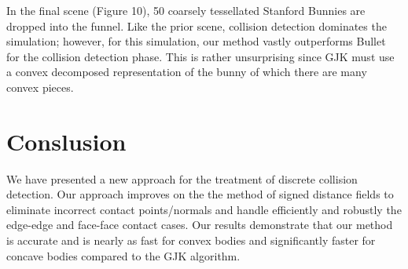 \documentclass[9pt,twocolumn]{article}
\begin{document}
In the final scene (Figure 10), 50 coarsely tessellated Stanford Bunnies are dropped into the funnel. Like the prior scene, collision detection dominates the simulation; however, for this simulation, our method vastly outperforms Bullet for the collision detection phase. This is rather unsurprising since GJK must use a convex decomposed representation of the bunny of which there are many convex pieces. 

\section{Conslusion}

We have presented a new approach for the treatment of discrete collision detection. Our approach improves on the the method of signed distance fields to eliminate incorrect contact points/normals and handle efficiently and robustly the edge-edge and face-face contact cases. Our results demonstrate that our method is accurate and is nearly as fast for convex bodies and significantly faster for concave bodies compared to the GJK algorithm.
\end{document}
